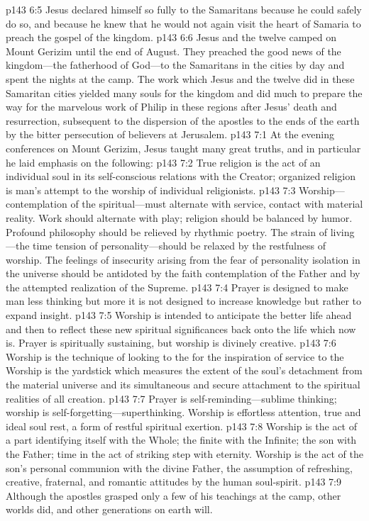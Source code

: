 \vs p143 6:5 Jesus declared himself so fully to the Samaritans because he could safely do so, and because he knew that he would not again visit the heart of Samaria to preach the gospel of the kingdom.
\vs p143 6:6 Jesus and the twelve camped on Mount Gerizim until the end of August. They preached the good news of the kingdom---the fatherhood of God---to the Samaritans in the cities by day and spent the nights at the camp. The work which Jesus and the twelve did in these Samaritan cities yielded many souls for the kingdom and did much to prepare the way for the marvelous work of Philip in these regions after Jesus’ death and resurrection, subsequent to the dispersion of the apostles to the ends of the earth by the bitter persecution of believers at Jerusalem.
\vs p143 7:1 At the evening conferences on Mount Gerizim, Jesus taught many great truths, and in particular he laid emphasis on the following:
\pc \vs p143 7:2 True religion is the act of an individual soul in its self\hyp{}conscious relations with the Creator; organized religion is man’s attempt to  the worship of individual religionists.
\pc \vs p143 7:3 Worship---contemplation of the spir\-i\-tu\-al---must alternate with service, contact with material reality. Work should alternate with play; religion should be balanced by humor. Profound philosophy should be relieved by rhythmic poetry. The strain of living---the time tension of personality---should be relaxed by the restfulness of worship. The feelings of insecurity arising from the fear of personality isolation in the universe should be antidoted by the faith contemplation of the Father and by the attempted realization of the Supreme.
\pc \vs p143 7:4 Prayer is designed to make man less thinking but more  it is not designed to increase knowledge but rather to expand insight.
\pc \vs p143 7:5 Worship is intended to anticipate the better life ahead and then to reflect these new spiritual significances back onto the life which now is. Prayer is spiritually sustaining, but worship is divinely creative.
\pc \vs p143 7:6 Worship is the technique of looking to the  for the inspiration of service to the  Worship is the yardstick which measures the extent of the soul’s detachment from the material universe and its simultaneous and secure attachment to the spiritual realities of all creation.
\pc \vs p143 7:7 Prayer is self\hyp{}reminding---sublime thinking; worship is self\hyp{}forgetting---super\-think\-ing. Worship is effortless attention, true and ideal soul rest, a form of restful spiritual exertion.
\pc \vs p143 7:8 Worship is the act of a part identifying itself with the Whole; the finite with the Infinite; the son with the Father; time in the act of striking step with eternity. Worship is the act of the son’s personal communion with the divine Father, the assumption of refreshing, creative, fraternal, and romantic attitudes by the human soul\hyp{}spirit.
\pc \vs p143 7:9 Although the apostles grasped only a few of his teachings at the camp, other worlds did, and other generations on earth will.\plusone
